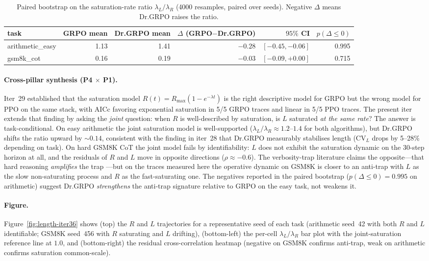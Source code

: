 \begin{table}[t]
\centering
\small
\caption{Paired bootstrap on the saturation-rate ratio
$\lambda_L / \lambda_R$ (4000 resamples, paired over seeds). Negative
$\Delta$ means Dr.GRPO raises the ratio.}
\label{tab:length-iter36-cross}
\begin{tabular}{lrrrrr}
\toprule
task & GRPO mean & Dr.GRPO mean & $\Delta$ (GRPO$-$Dr.GRPO) &
$95\%$ CI & $p(\Delta \le 0)$ \\
\midrule
arithmetic\_easy & 1.13 & 1.41 & $-0.28$ & $[-0.45, -0.06]$ & 0.995 \\
gsm8k\_cot       & 0.16 & 0.19 & $-0.03$ & $[-0.09, +0.00]$ & 0.715 \\
\bottomrule
\end{tabular}
\end{table}

\paragraph{Cross-pillar synthesis (P4 $\times$ P1).}
Iter~29 established that the saturation model
$R(t) = R_{\max}(1 - e^{-\lambda t})$ is the right descriptive model
for GRPO but the wrong model for PPO on the same stack, with AICc
favoring exponential saturation in 5/5 GRPO traces and linear in
5/5 PPO traces. The present iter extends that finding by asking the
\emph{joint} question: when $R$ is well-described by saturation, is
$L$ saturated \emph{at the same rate}? The answer is task-conditional.
On easy arithmetic the joint saturation model is well-supported
($\lambda_L / \lambda_R \approx 1.2$--$1.4$ for both algorithms), but
Dr.GRPO shifts the ratio upward by $\sim 0.14$, consistent with the
finding in iter~28 that Dr.GRPO measurably stabilises length
(CV$_L$ drops by 5--28\% depending on task). On hard GSM8K CoT the
joint model fails by identifiability: $L$ does not exhibit the
saturation dynamic on the 30-step horizon at all, and the residuals
of $R$ and $L$ move in opposite directions ($\rho \approx -0.6$).
The verbosity-trap literature claims the opposite---that hard
reasoning \emph{amplifies} the trap \cite{singhal2023drdrpo}---but on
the traces measured here the operative dynamic
on GSM8K is closer to an anti-trap with $L$ as the slow
non-saturating process and $R$ as the fast-saturating one. The
negatives reported in the paired bootstrap ($p(\Delta \le 0) = 0.995$
on arithmetic) suggest Dr.GRPO \emph{strengthens} the anti-trap
signature relative to GRPO on the easy task, not weakens it.

\paragraph{Figure.}
Figure~\ref{fig:length-iter36} shows (top) the $R$ and $L$ trajectories
for a representative seed of each task (arithmetic seed~42 with both
$R$ and $L$ identifiable; GSM8K seed~456 with $R$ saturating and
$L$ drifting), (bottom-left) the per-cell $\lambda_L / \lambda_R$
bar plot with the joint-saturation reference line at $1.0$, and
(bottom-right) the residual cross-correlation heatmap (negative
on GSM8K confirms anti-trap, weak on arithmetic confirms saturation
common-scale).

